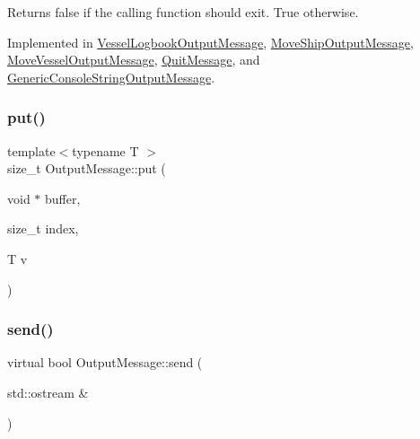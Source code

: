 \begin{DoxyReturn}{Returns}
false if the calling function should exit. True otherwise. 
\end{DoxyReturn}


Implemented in \mbox{\hyperlink{class_vessel_logbook_output_message_a1892b1fa2d328eee48f88a52d6bd96b3}{Vessel\+Logbook\+Output\+Message}}, \mbox{\hyperlink{class_move_ship_output_message_aca14c61d3c88d156378bb999efac22dc}{Move\+Ship\+Output\+Message}}, \mbox{\hyperlink{class_move_vessel_output_message_ab503e94c98c0a66470a283cbf5b29c78}{Move\+Vessel\+Output\+Message}}, \mbox{\hyperlink{class_quit_message_a780765be639ff408f1d1acf2f5eef851}{Quit\+Message}}, and \mbox{\hyperlink{class_generic_console_string_output_message_a89a8f1a84f56aac8d98984d552095155}{Generic\+Console\+String\+Output\+Message}}.

\mbox{\label{class_output_message_a3cdeed110f7abc0f23c2c50d28b1db6d}} 
\subsubsection{\texorpdfstring{put()}{put()}}
{\footnotesize\ttfamily template$<$typename T $>$ \\
size\+\_\+t Output\+Message\+::put (\begin{DoxyParamCaption}\item[{void $\ast$}]{buffer,  }\item[{size\+\_\+t}]{index,  }\item[{T}]{v }\end{DoxyParamCaption})\hspace{0.3cm}{\ttfamily [inline]}}

\mbox{\label{class_output_message_a6f817de4d3430dc98521431385b95328}} 
\subsubsection{\texorpdfstring{send()}{send()}}
{\footnotesize\ttfamily virtual bool Output\+Message\+::send (\begin{DoxyParamCaption}\item[{std\+::ostream \&}]{ }\end{DoxyParamCaption})\hspace{0.3cm}{\ttfamily [pure virtual]}}



